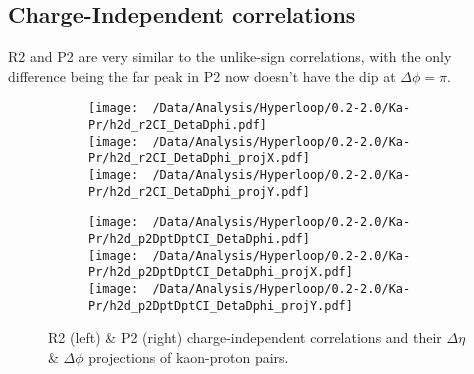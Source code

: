 \documentclass[12pt,a4paper,twoside]{report}
\begin{document}
\subsection{Charge-Independent correlations}
R2 and P2 are very similar to the unlike-sign correlations, with the only difference being the far peak in P2 now doesn't have the dip at $\Delta\phi=\pi$.
\begin{figure}[H]
	\begin{subfigure}{0.49\linewidth}
		\texttt{[image: ~/Data/Analysis/Hyperloop/0.2-2.0/Ka-Pr/h2d\_r2CI\_DetaDphi.pdf]}\\
		\texttt{[image: ~/Data/Analysis/Hyperloop/0.2-2.0/Ka-Pr/h2d\_r2CI\_DetaDphi\_projX.pdf]}\\
		\texttt{[image: ~/Data/Analysis/Hyperloop/0.2-2.0/Ka-Pr/h2d\_r2CI\_DetaDphi\_projY.pdf]}\\
	\end{subfigure}
	\begin{subfigure}{0.49\linewidth}
		\texttt{[image: ~/Data/Analysis/Hyperloop/0.2-2.0/Ka-Pr/h2d\_p2DptDptCI\_DetaDphi.pdf]}\\
		\texttt{[image: ~/Data/Analysis/Hyperloop/0.2-2.0/Ka-Pr/h2d\_p2DptDptCI\_DetaDphi\_projX.pdf]}\\
		\texttt{[image: ~/Data/Analysis/Hyperloop/0.2-2.0/Ka-Pr/h2d\_p2DptDptCI\_DetaDphi\_projY.pdf]}\\
	\end{subfigure}
	\caption{R2 (left) \& P2 (right) charge-independent correlations and their $\Delta\eta$ \& $\Delta\phi$ projections of kaon-proton pairs.}
\end{figure}
\end{document}
